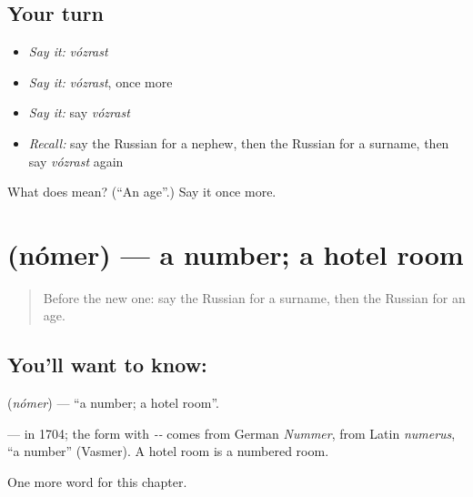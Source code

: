 \subsection*{Your turn}
\begin{itemize}
\raggedright
  \item \emph{Say it:} \emph{vózrast}
  \item \emph{Say it:} \emph{vózrast}, once more
  \item \emph{Say it:} say \emph{vózrast}
  \item \emph{Recall:} say the Russian for a nephew, then the Russian for a surname, then say \emph{vózrast} again
\end{itemize}

\begin{tcolorbox}[breakable,colback=teal!4,colframe=teal!35!black,title={Before you move on}]
What does  mean? (\textquotedblleft{}An age\textquotedblright{}.) Say it once more.
\end{tcolorbox}
\section[\texorpdfstring{\ru{номер} (nómer)}{номер (nómer)}]{ (nómer) — a number; a hotel room}

\label{lesson:RU-C255-nomer}



\begin{quote}
Before the new one: say the Russian for a surname, then the Russian for an age.
\end{quote}

\subsection*{You'll want to know: }
\textbf{} (\emph{nómer}) — \textquotedblleft{}a number; a hotel room\textquotedblright{}.

\begin{cousinweb}
\textbf{} — \emph{} in 1704; the form with \emph{--} comes from German \emph{Nummer}, from Latin \emph{numerus}, \textquotedblleft{}a number\textquotedblright{} (Vasmer). A hotel room is a numbered room.
\end{cousinweb}

\begin{grammarlens}[title={What you've built}]
One more word for this chapter.
\end{grammarlens}

